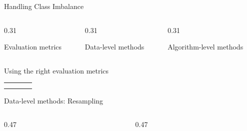 \begin{frame}{Handling Class Imbalance}
  \begin{columns}[T,onlytextwidth]
    \begin{column}{0.31\textwidth}
      \begin{tdblockt}[equal height group=hci]{Evaluation metrics}
      \end{tdblockt}
    \end{column}
    \begin{column}{0.31\textwidth}
      \begin{tdblockt}[equal height group=hci]{Data-level methods}
      \end{tdblockt}
    \end{column}
    \begin{column}{0.31\textwidth}
      \begin{tdblockt}[equal height group=hci]{Algorithm-level methods}
      \end{tdblockt}
    \end{column}
  \end{columns}
\end{frame}

\begin{frame}{Using the right evaluation metrics}
  \footnotesize
  \renewcommand{\arraystretch}{1.25}
  \begin{tabular}{@{}llll@{}}
    \toprule
     & & & \\
    \midrule
     & & & \\
     & & & \\
    \bottomrule
  \end{tabular}
\end{frame}

\begin{frame}{Data-level methods: Resampling}
  \begin{columns}[T,onlytextwidth]
    \begin{column}{0.47\textwidth}
      \begin{tdblock}[equal height group=rsmp]
      \end{tdblock}
    \end{column}
    \begin{column}{0.47\textwidth}
      \begin{tdblock}[equal height group=rsmp]
      \end{tdblock}
    \end{column}
  \end{columns}
\end{frame}

